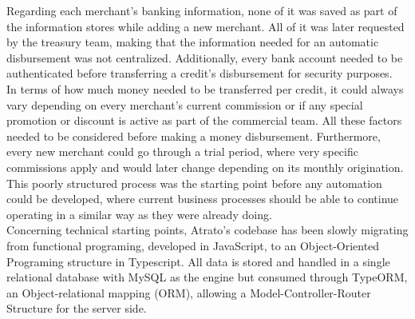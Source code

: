 Regarding each merchant’s banking information, none of it was saved as part of the information stores while adding a new merchant. All of it was later requested by the treasury team, making that the information needed for an automatic disbursement was not centralized. Additionally, every bank account needed to be authenticated before transferring a credit’s disbursement for security purposes.\\

In terms of how much money needed to be transferred per credit, it could always vary depending on every merchant’s current commission or if any special promotion or discount is active as part of the commercial team. All these factors needed to be considered before making a money disbursement. Furthermore, every new merchant could go through a trial period, where very specific commissions apply and would later change depending on its monthly origination. \\

This poorly structured process was the starting point before any automation could be developed, where current business processes should be able to continue operating in a similar way as they were already doing.\\

Concerning technical starting points, Atrato’s codebase has been slowly migrating from functional programing, developed in JavaScript, to an Object-Oriented Programing structure in Typescript. All data is stored and handled in a single relational database with MySQL as the engine but consumed through TypeORM, an Object-relational mapping (ORM), allowing a Model-Controller-Router Structure for the server side.\\
